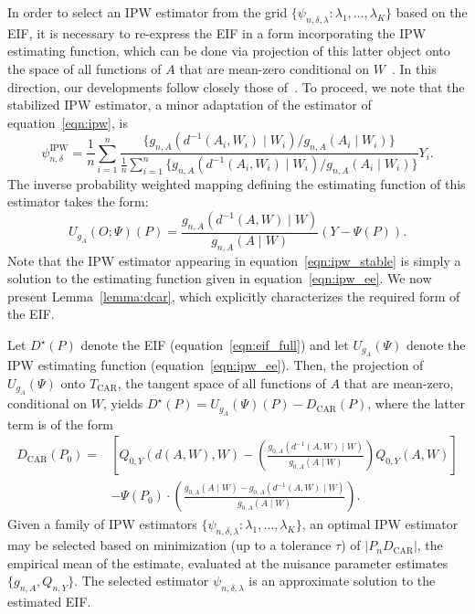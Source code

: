 In order to select an IPW estimator from the grid $\{\psi_{n,\delta,\lambda}:
\lambda_1, \ldots, \lambda_K \}$ based on the EIF, it is necessary to re-express
the EIF in a form incorporating the IPW estimating function, which can be done
via projection of this latter object onto the space of all functions of $A$ that
are mean-zero conditional on $W$~\citep{robins1994estimation,vdl2003unified}.
In this direction, our developments follow closely those
of~\citet{ertefaie2020nonparametric}. To proceed, we note that the stabilized
IPW estimator, a minor adaptation of the estimator of equation~\ref{eqn:ipw}, is
\begin{equation}\label{eqn:ipw_stable}
  \psi_{n,\delta}^{\text{IPW}} = \frac{1}{n} \sum_{i=1}^n
  \frac{\{g_{n, A}(d^{-1}(A_i, W_i) \mid W_i) / g_{n, A}(A_i \mid W_i)\}}{
  \frac{1}{n} \sum_{i=1}^n\{g_{n, A}(d^{-1}(A_i, W_i) \mid W_i) /
  g_{n, A}(A_i \mid W_i)\}} Y_i .
\end{equation}
The inverse probability weighted mapping defining the estimating function of
this estimator takes the form:
\begin{equation}\label{eqn:ipw_ee}
  U_{g_A}(O; \Psi)(P) = \frac{g_{n, A}(d^{-1}(A, W) \mid W)}
    {g_{n, A}(A \mid W)}(Y - \Psi(P)).
\end{equation}
Note that the IPW estimator appearing in equation~\ref{eqn:ipw_stable} is simply
a solution to the estimating function given in equation~\ref{eqn:ipw_ee}.
We now present Lemma~\ref{lemma:dcar}, which explicitly characterizes the
required form of the EIF.
\begin{lemma}\label{lemma:dcar}
  Let $D^{\star}(P)$ denote the EIF (equation~\ref{eqn:eif_full}) and let
  $U_{g_A}(\Psi)$ denote the IPW estimating function
  (equation~\ref{eqn:ipw_ee}). Then, the projection of $U_{g_A}(\Psi)$ onto
  $T_{\text{CAR}}$, the tangent space of all functions of $A$ that are
  mean-zero, conditional on $W$, yields $D^{\star}(P) = U_{g_A}(\Psi)(P)
  - D_{\text{CAR}}(P)$, where the latter term is of the form
  \begin{align*}
    D_{\text{CAR}}(P_0) =& \left[Q_{0,Y}(d(A,W),W) -
    \left(\frac{g_{0,A}(d^{-1}(A,W) \mid W)}{g_{0,A}(A \mid W)}\right)
    Q_{0,Y}(A,W)\right]\\ &- \Psi(P_0) \cdot \left(\frac{g_{0,A}(A \mid W) -
    g_{0,A}(d^{-1}(A,W) \mid W)}{g_{0,A}(A \mid W)}\right) .
  \end{align*}
  Given a family of IPW estimators $\{\psi_{n,\delta,\lambda}: \lambda_1,
  \ldots, \lambda_K\}$, an optimal IPW estimator may be selected based on
  minimization (up to a tolerance $\tau$) of $\lvert P_n D_{\text{CAR}} \rvert$,
  the empirical mean of the estimate, evaluated at the nuisance parameter
  estimates $\{g_{n,A}, Q_{n,Y}\}$. The selected estimator
  $\psi_{n,\delta,\lambda}$ is an approximate solution to the estimated EIF.
\end{lemma}
